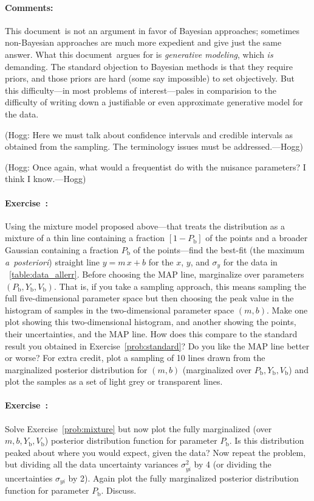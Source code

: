 \documentclass[12pt,twoside]{article}
\newcommand{\notenglish}[1]{\textsl{#1}}
\newcommand{\aposteriori}{\notenglish{a~posteriori}}
\newcommand{\documentname}{document}
\newcommand{\problemname}{Exercise}
\newcommand{\commentsname}{Comments}
\newcounter{problem}
\newenvironment{problem}{\paragraph{\problemname~\theproblem:}\refstepcounter{problem}}{}
\newenvironment{comments}{\paragraph{\commentsname:}}{}
\newcommand{\Pbad}{P_{\mathrm{b}}}
\newcommand{\Ybad}{Y_{\mathrm{b}}}
\newcommand{\Vbad}{V_{\mathrm{b}}}
\begin{document}
\begin{comments}
This \documentname\ is not an argument in favor of Bayesian
approaches; sometimes non-Bayesian approaches are much more expedient
and give just the same answer.  What this \documentname\ argues for is
\emph{generative modeling}, which \emph{is} demanding.  The standard
objection to Bayesian methods is that they require priors, and those
priors are hard (some say impossible) to set objectively.  But this
difficulty---in most problems of interest---pales in comparision to
the difficulty of writing down a justifiable or even approximate
generative model for the data.

(Hogg: Here we must talk about confidence intervals and credible
intervals as obtained from the sampling.  The terminology issues must
be addressed.---Hogg)

(Hogg: Once again, what would a frequentist do with the nuisance
parameters?  I think I know.---Hogg)
\end{comments}

\begin{problem}\label{prob:mixture}
Using the mixture model proposed above---that treats the distribution
as a mixture of a thin line containing a fraction $[1-\Pbad]$ of the
points and a broader Gaussian containing a fraction $\Pbad$ of the
points---find the best-fit (the maximum \aposteriori) straight line
$y=m\,x+b$ for the $x$, $y$, and $\sigma_y$ for the data in
\tablename~\ref{table:data_allerr}.  Before choosing the MAP line,
marginalize over parameters $(\Pbad,\Ybad,\Vbad)$.  That is, if you
take a sampling approach, this means sampling the full
five-dimensional parameter space but then choosing the peak value in
the histogram of samples in the two-dimensional parameter space
$(m,b)$.  Make one plot showing this two-dimensional histogram, and
another showing the points, their uncertainties, and the MAP line.
How does this compare to the standard result you obtained in
\problemname~\ref{prob:standard}?  Do you like the MAP line better or
worse?  For extra credit, plot a sampling of 10 lines drawn from the
marginalized posterior distribution for $(m,b)$ (marginalized over
$\Pbad,\Ybad,\Vbad$) and plot the samples as a set of light grey or
transparent lines.
\end{problem}

\begin{problem}\label{prob:badfraction}
Solve \problemname~\ref{prob:mixture} but now plot the fully
marginalized (over $m,b,\Ybad,\Vbad$) posterior distribution function
for parameter $\Pbad$.  Is this distribution peaked about where you
would expect, given the data?  Now repeat the problem, but dividing
all the data uncertainty variances $\sigma_{yi}^2$ by 4 (or dividing
the uncertainties $\sigma_{yi}$ by 2).  Again plot the fully
marginalized posterior distribution function for parameter $\Pbad$.
Discuss.
\end{problem}
\end{document}

